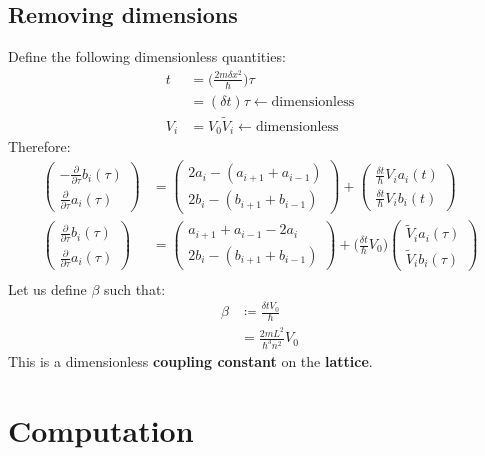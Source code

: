 \documentclass[11pt,letterpaper]{article}
\begin{document}
	\subsection{Removing dimensions}
	Define the following dimensionless quantities:
	\begin{align*}
		t&=\Big( \frac{2m\delta x^2}{\hbar} \Big) \tau\\
		&=(\delta t)\tau \leftarrow \text{dimensionless}\\
		V_i&=V_0 \widetilde{V}_i \leftarrow \text{dimensionless}
	\end{align*}
	Therefore:
	\begin{align*}
		\begin{pmatrix}
			-\frac{\partial}{\partial \tau} b_i(\tau) \\
			\frac{\partial}{\partial \tau} a_i(\tau)
		\end{pmatrix}
		&=
		\begin{pmatrix}
			2a_i-(a_{i+1}+a_{i-1}) \\
			2b_i-(b_{i+1}+b_{i-1})
		\end{pmatrix}
		+
		\begin{pmatrix}
			\frac{\delta t}{\hbar} V_i a_i(t)\\
			\frac{\delta t}{\hbar} V_i b_i(t)
		\end{pmatrix}\\
		\begin{pmatrix}
			\frac{\partial}{\partial \tau} b_i(\tau) \\
			\frac{\partial}{\partial \tau} a_i(\tau)
		\end{pmatrix}
		&=
		\begin{pmatrix}
			a_{i+1}+a_{i-1}-2a_i\\
			2b_i-(b_{i+1}+b_{i-1})
		\end{pmatrix}
		+
		\Big( \frac{\delta t}{\hbar} V_0 \Big)
		\begin{pmatrix}
			\widetilde{V}_i a_i(\tau) \\
			\widetilde{V}_i b_i(\tau)
		\end{pmatrix}\\
	\end{align*}
	Let us define $\beta$ such that:
	\begin{align*}
		\beta &\coloneqq \frac{\delta t V_0}{\hbar} \\
		&=\frac{2mL^2}{\hbar^3 n^2} V_0
	\end{align*}
	This is a dimensionless \textbf{coupling constant} on the \textbf{lattice}.
	\section{Computation}
\end{document}
